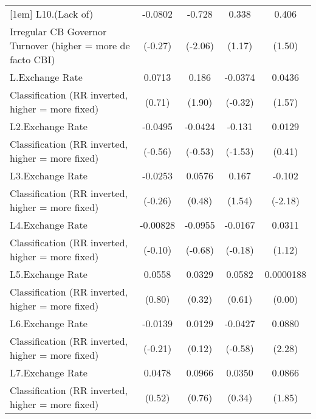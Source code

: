 {\begin{tabular}{l*{4}{c}}
[1em]
L10.(Lack of)       &     -0.0802         &      -0.728\sym{*}  &       0.338         &       0.406         \\
Irregular CB Governor Turnover (higher = more de facto CBI)&     (-0.27)         &     (-2.06)         &      (1.17)         &      (1.50)         \\
[1em]
L.Exchange Rate     &      0.0713         &       0.186         &     -0.0374         &      0.0436         \\
Classification (RR inverted, higher = more fixed)&      (0.71)         &      (1.90)         &     (-0.32)         &      (1.57)         \\
[1em]
L2.Exchange Rate    &     -0.0495         &     -0.0424         &      -0.131         &      0.0129         \\
Classification (RR inverted, higher = more fixed)&     (-0.56)         &     (-0.53)         &     (-1.53)         &      (0.41)         \\
[1em]
L3.Exchange Rate    &     -0.0253         &      0.0576         &       0.167         &      -0.102\sym{*}  \\
Classification (RR inverted, higher = more fixed)&     (-0.26)         &      (0.48)         &      (1.54)         &     (-2.18)         \\
[1em]
L4.Exchange Rate    &    -0.00828         &     -0.0955         &     -0.0167         &      0.0311         \\
Classification (RR inverted, higher = more fixed)&     (-0.10)         &     (-0.68)         &     (-0.18)         &      (1.12)         \\
[1em]
L5.Exchange Rate    &      0.0558         &      0.0329         &      0.0582         &   0.0000188         \\
Classification (RR inverted, higher = more fixed)&      (0.80)         &      (0.32)         &      (0.61)         &      (0.00)         \\
[1em]
L6.Exchange Rate    &     -0.0139         &      0.0129         &     -0.0427         &      0.0880\sym{*}  \\
Classification (RR inverted, higher = more fixed)&     (-0.21)         &      (0.12)         &     (-0.58)         &      (2.28)         \\
[1em]
L7.Exchange Rate    &      0.0478         &      0.0966         &      0.0350         &      0.0866         \\
Classification (RR inverted, higher = more fixed)&      (0.52)         &      (0.76)         &      (0.34)         &      (1.85)         \\

\end{tabular}}
